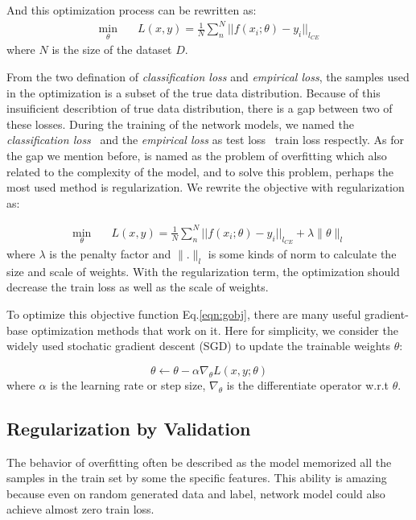 \documentclass[english]{sobraep}
\begin{document}
And this optimization process can be rewritten as:
\begin{align}
    \min_{\theta} \quad &L(x,y) = \frac{1}{N}\sum_n^N ||f(x_i;\theta) - y_i||_{l_{CE}}
\end{align}
where $N$ is the size of the dataset $D$.

From the two defination of \textit{classification loss} and \textit{empirical loss}, the samples used in the optimization is a subset of the true data distribution. Because of this insuificient describtion of true data distribution, there is a gap between two of these losses.  During the training of the network models, we named the \textit{classification loss} \ and the \textit{empirical loss} as test loss \ train loss respectly. As for the gap we mention before, is named as the problem of overfitting which also related to the complexity of the model, and to solve this problem, perhaps the most used method is regularization. We rewrite the objective with regularization as: 

\begin{align}\label{eqn:gobj}
    \min_{\theta} \quad &L(x,y) =  \frac{1}{N}\sum_n^N ||f(x_i;\theta) - y_i||_{l_{CE}}+ \lambda \|\theta\|_l
\end{align}
where $\lambda$ is the penalty factor and  $\|.\|_l$ is some kinds of norm to calculate the size and scale of weights. With the regularization term, the optimization should decrease the train loss as well as the scale of weights. 

To optimize this objective function Eq.\ref{eqn:gobj}, there are many useful gradient-base optimization methods that work on it. Here for simplicity, we consider the widely used stochatic gradient descent (SGD) to update the trainable weights $\theta$:

\begin{equation}\label{eqn:gsgd}
    \theta \xleftarrow{} \theta  - \alpha \nabla_{\theta}L(x,y;\theta)
\end{equation}
where $\alpha$ is the learning rate or step size, $\nabla_{\theta}$ is the differentiate operator w.r.t $\theta$.

\subsection{Regularization by Validation}

The behavior of overfitting often be described as the model memorized all the samples in the train set by some the specific features. This ability is amazing because even on random generated data and label, network model could also achieve almost zero train loss. 
\end{document}
